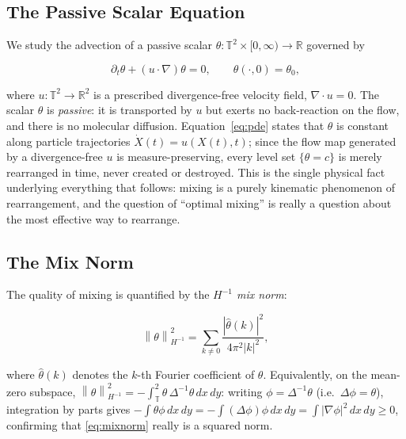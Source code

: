 \documentclass[12pt,a4paper]{article}
\newcommand{\norm}[1]{\left\lVert#1\right\rVert}
\newcommand{\Lap}{\Delta}
\newcommand{\lapinv}{\Delta^{-1}}
\newcommand{\Real}{\mathbb{R}}
\newcommand{\Torus}{\mathbb{T}^2}
\newcommand{\dx}{\,dx\,dy}
\theoremstyle{definition}
\theoremstyle{plain}
\begin{document}
\subsection{The Passive Scalar Equation}

We study the advection of a passive scalar $\theta : \Torus\times[0,\infty)
\to \Real$ governed by

\begin{equation}
  \label{eq:pde}
  \partial_t\theta + (u\cdot\nabla)\theta = 0,
  \qquad \theta(\cdot,0) = \theta_0,
\end{equation}

where $u:\Torus\to\Real^2$ is a prescribed divergence-free velocity field,
$\nabla\cdot u = 0$. The scalar $\theta$ is \emph{passive}: it is transported
by $u$ but exerts no back-reaction on the flow, and there is no molecular
diffusion. Equation~\eqref{eq:pde} states that $\theta$ is constant along
particle trajectories $\dot X(t) = u(X(t),t)$; since the flow map generated
by a divergence-free $u$ is measure-preserving, every level set $\{\theta =
c\}$ is merely rearranged in time, never created or destroyed. This is the
single physical fact underlying everything that follows: mixing is a purely
kinematic phenomenon of rearrangement, and the question of ``optimal
mixing'' is really a question about the most effective way to rearrange.

\subsection{The Mix Norm}
\label{sec:mixnorm-def}

The quality of mixing is quantified by the \emph{$H^{-1}$ mix norm}:

\begin{equation}
  \label{eq:mixnorm}
  \norm{\theta}_{H^{-1}}^2
  = \sum_{k\neq 0} \frac{|\hat\theta(k)|^2}{4\pi^2|k|^2},
\end{equation}

where $\hat\theta(k)$ denotes the $k$-th Fourier coefficient of $\theta$.
Equivalently, on the mean-zero subspace, $\norm{\theta}_{H^{-1}}^2 =
-\int_\Torus \theta\,\lapinv\theta \dx$: writing $\phi = \lapinv\theta$
(i.e.\ $\Lap\phi=\theta$), integration by parts gives $-\int\theta\phi\dx =
-\int(\Lap\phi)\phi\dx = \int|\nabla\phi|^2\dx \ge 0$, confirming that
\eqref{eq:mixnorm} really is a squared norm.
\end{document}
